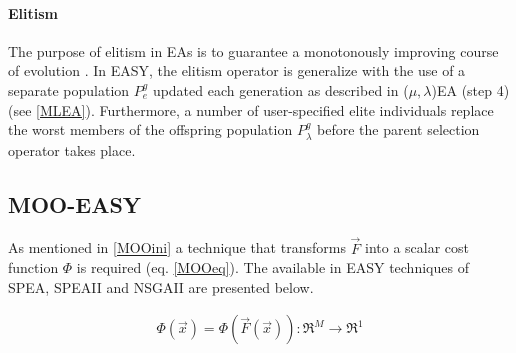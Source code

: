 

\paragraph{Elitism}
The purpose of elitism in EAs is to guarantee a monotonously improving course of evolution \cite{Back1996}. In EASY, the elitism operator is generalize with the use of a separate population $P_e^g$ updated each generation as described in ($\mu,\lambda$)EA (step 4) (see \ref{MLEA}). Furthermore, a number of user-specified elite individuals replace the worst members of the offspring population $P^g_{\lambda}$ before the parent selection operator takes place.
  
\subsection{MOO-EASY}
\label{MOO}
As mentioned in \ref{MOOini} a technique that transforms $\vec{F}$ into a scalar cost function $\Phi$ is required (eq. \ref{MOOeq}). The available in EASY techniques of SPEA, SPEAII and NSGAII are presented below.

\begin{eqnarray}
    \Phi(\vec{x})=\Phi(\vec{F}(\vec{x})) :\Re ^M \rightarrow \Re ^1 
	\label{MOOeq}
\end{eqnarray}

